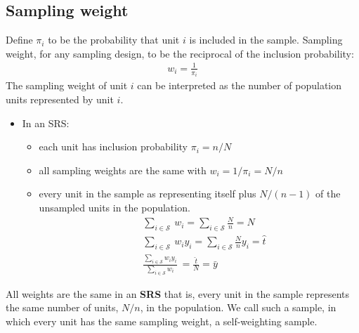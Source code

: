 \documentclass[a4paper,twoside,11pt]{article}
\begin{document}
\subsection{Sampling weight}
Define $\pi_i$ to be the probability that unit $i$ is included in the sample. 
\newline
\newline
Sampling weight, for any sampling design, to be the reciprocal of the inclusion probability:
\begin{equation*}
\begin{aligned}
w_i = \frac{1}{\pi_i}
\end{aligned}
\end{equation*}
The sampling weight of unit $i$ can be interpreted as the number of population units represented by unit $i$.
\begin{itemize}
    \item In an SRS:
    \begin{itemize}
        \item each unit has inclusion probability $\pi_i = n/N$
        \item all sampling weights are the same with $w_i = 1/ \pi_i = N/n$
        \item every unit in the sample as representing itself plus $N/(n-1)$ of the unsampled units in the population.
\newline
\begin{equation*}
\begin{aligned}
& \ \sum_{i \in \mathcal{S}} \  w_i = \sum_{i \in \mathcal{S}} \frac{N}{n} = N \\
& \ \sum_{i \in \mathcal{S}} \  w_i y_i = \sum_{i \in \mathcal{S}} \frac{N}{n} y_i = \hat{t} \\
& \ \frac{\sum_{i \in \mathcal{S}}w_i y_i }{\sum_{i \in \mathcal{S}} w_i} \  = \frac{\hat{t}}{N} = \bar{y}
\end{aligned}
\end{equation*}
    \end{itemize}
\end{itemize}
\noindent All weights are the same in an \textbf{SRS} that is, every unit in the sample represents the same number of units, $N/n$, in the population. We call such a sample, in which every unit has the same sampling weight, a self-weighting sample.
\end{document}
